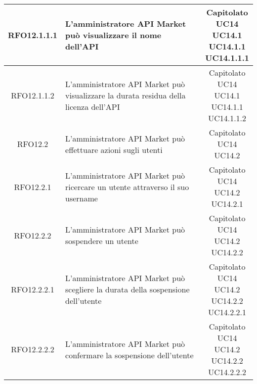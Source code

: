 \begin{longtable}{|c|p{8cm}|c|}
\hypertarget{RFO12.1.1.1}{RFO12.1.1.1} & L'amministratore API Market può visualizzare il nome dell'API & \makecell*{Capitolato\\UC14\\UC14.1\\UC14.1.1\\UC14.1.1.1} \\
\hline

\hypertarget{RFO12.1.1.2}{RFO12.1.1.2} & L'amministratore API Market può visualizzare la durata residua della licenza dell'API & \makecell*{Capitolato\\UC14\\UC14.1\\UC14.1.1\\UC14.1.1.2} \\
\hline

\hypertarget{RFO12.2}{RFO12.2} & L'amministratore API Market può effettuare azioni sugli utenti & \makecell*{Capitolato\\UC14\\UC14.2} \\
\hline

\hypertarget{RFO12.2.1}{RFO12.2.1} & L'amministratore API Market può ricercare un utente attraverso il suo username & \makecell*{Capitolato\\UC14\\UC14.2\\UC14.2.1} \\
\hline

\hypertarget{RFO12.2.2}{RFO12.2.2} & L'amministratore API Market può sospendere un utente & \makecell*{Capitolato\\UC14\\UC14.2\\UC14.2.2} \\
\hline

\hypertarget{RFO12.2.2.1}{RFO12.2.2.1} & L'amministratore API Market può scegliere la durata della sospensione dell'utente & \makecell*{Capitolato\\UC14\\UC14.2\\UC14.2.2\\UC14.2.2.1} \\
\hline

\hypertarget{RFO12.2.2.2}{RFO12.2.2.2} & L'amministratore API Market può confermare la sospensione dell'utente & \makecell*{Capitolato\\UC14\\UC14.2\\UC14.2.2\\UC14.2.2.2} \\
\hline


\end{longtable}
